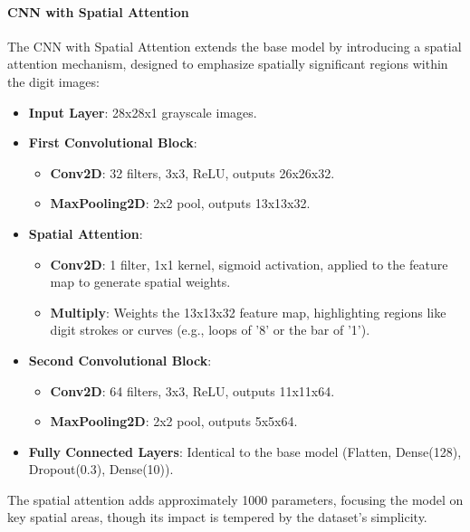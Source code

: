 \documentclass[12pt]{article}
\begin{document}
\paragraph{CNN with Spatial Attention}
The CNN with Spatial Attention extends the base model by introducing a spatial attention mechanism, designed to emphasize spatially significant regions within the digit images:
\begin{itemize}
    \item \textbf{Input Layer}: 28x28x1 grayscale images.
    \item \textbf{First Convolutional Block}:
        \begin{itemize}
            \item \textbf{Conv2D}: 32 filters, 3x3, ReLU, outputs 26x26x32.
            \item \textbf{MaxPooling2D}: 2x2 pool, outputs 13x13x32.
        \end{itemize}
    \item \textbf{Spatial Attention}:
        \begin{itemize}
            \item \textbf{Conv2D}: 1 filter, 1x1 kernel, sigmoid activation, applied to the feature map to generate spatial weights.
            \item \textbf{Multiply}: Weights the 13x13x32 feature map, highlighting regions like digit strokes or curves (e.g., loops of '8' or the bar of '1').
        \end{itemize}
    \item \textbf{Second Convolutional Block}:
        \begin{itemize}
            \item \textbf{Conv2D}: 64 filters, 3x3, ReLU, outputs 11x11x64.
            \item \textbf{MaxPooling2D}: 2x2 pool, outputs 5x5x64.
        \end{itemize}
    \item \textbf{Fully Connected Layers}: Identical to the base model (Flatten, Dense(128), Dropout(0.3), Dense(10)).
\end{itemize}
The spatial attention adds approximately 1000 parameters, focusing the model on key spatial areas, though its impact is tempered by the dataset's simplicity.
\end{document}
